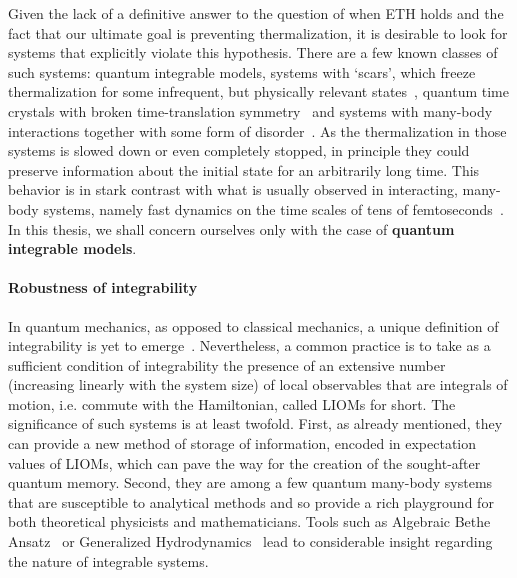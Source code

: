 Given the lack of a definitive answer to the question of when ETH holds and the fact that our ultimate goal is preventing thermalization, it is desirable to look for systems
that explicitly violate this hypothesis. There are a few known classes of such systems:
quantum integrable models, systems with `scars', which freeze thermalization for
some infrequent, but physically relevant states~\autocite{Turner2018a, Turner2018}, quantum time crystals with
broken time-translation symmetry~\autocite{Wilczek2012, Sacha2017} and systems with many-body interactions together
with some form of disorder~\autocite{Basko_2006}. As the thermalization in those systems is slowed down or even
completely stopped, in principle they could preserve information about the initial state for an arbitrarily long time.
This behavior is in stark contrast with what is usually observed in interacting, many-body systems, namely fast
dynamics on the time scales of tens of femtoseconds~\autocite{DalConte2015}.
In this thesis, we shall concern ourselves only with the case of \textbf{quantum integrable models}.

\paragraph{Robustness of integrability}
In quantum mechanics, as opposed to classical mechanics, a unique definition of integrability
is yet to emerge~\autocite{Caux2011, Yuzbashyan2013}. Nevertheless, a common practice is to take as a sufficient condition of
integrability the presence of an extensive number (increasing linearly with the system size) of local observables
that are integrals of motion, i.e. commute with the Hamiltonian, called LIOMs for short. The significance of such
systems is at least twofold.
First, as already mentioned, they can provide a new method of storage of information, encoded in expectation values
of LIOMs, which can pave the way for the creation of the sought-after quantum memory.
Second, they are among a few quantum many-body systems that are susceptible to analytical methods and so provide
a rich playground for both theoretical physicists and mathematicians. Tools such as Algebraic Bethe
Ansatz~\autocite{Faddeev1995,Faddeev1996,Korepin1993} or Generalized Hydrodynamics~\autocite{Agrawal2020,Friedman2020,
    Bertini2021, Bastianello2021, Bulchandani2021} lead to considerable insight regarding the nature of integrable systems.

